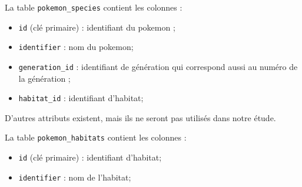 La table \texttt{pokemon\_species} contient les colonnes :

\begin{itemize}[itemsep=0mm]
	\item \texttt{id} (clé primaire) : identifiant du pokemon ;
	\item \texttt{identifier} : nom du pokemon;
	\item \texttt{generation\_id} : identifiant de génération qui correspond aussi au numéro de la génération ;
	\item \texttt{habitat\_id} : identifiant d'habitat;
\end{itemize}
D'autres attributs existent, mais ils ne seront pas utilisés dans notre étude. 

La table \texttt{pokemon\_habitats} contient les colonnes :

\begin{itemize}[itemsep=0mm]
	\item \texttt{id} (clé primaire) : identifiant d'habitat;
	\item \texttt{identifier} : nom de l'habitat;
\end{itemize}

